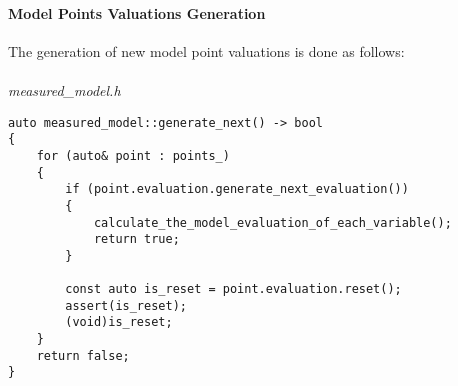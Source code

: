 \documentclass{article}
\begin{document}
	\paragraph{Model Points Valuations Generation}
	The generation of new model point valuations is done as follows:
	\\
	\\
\noindent
\textit{measured\_model.h}
\begin{lstlisting}
auto measured_model::generate_next() -> bool
{
    for (auto& point : points_)
    {
        if (point.evaluation.generate_next_evaluation())
        {
            calculate_the_model_evaluation_of_each_variable();
            return true;
        }

        const auto is_reset = point.evaluation.reset();
        assert(is_reset);
        (void)is_reset;
    }
    return false;
}
\end{lstlisting}
\end{document}
